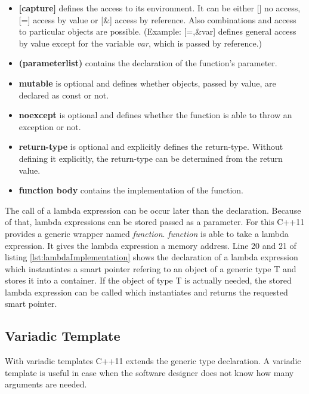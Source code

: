 {\begin{itemize}
  \item\textbf{[capture]} defines the access to its environment. It can be either [] no access, [=] access by value or [\&] access by reference. Also combinations and access to particular objects are possible. (Example: [=,\&var] defines general access by value except for the variable \emph{var}, which is passed by reference.)
  \item\textbf{(parameterlist)} contains the declaration of the function's parameter. 
  \item\textbf{mutable} is optional and defines whether objects, passed by value, are  declared as const or not. 
  \item\textbf{noexcept} is optional and defines whether the function is able to throw an exception or not.
  \item\textbf{return-type} is optional and explicitly defines the return-type. Without defining it explicitly, the return-type can be determined from the return value.
  \item\textbf{function body} contains the implementation of the function.
\end{itemize}

\noindent The call of a lambda expression can be occur later than the declaration. Because of that, lambda expressions can be stored passed as a parameter. For this C++11 provides a generic wrapper named \emph{function}. \emph{function} is able to take a lambda expression. It gives the lambda expression a memory address. Line 20 and 21 of listing \ref{lst:lambdaImplementation} shows the declaration of a lambda expression which instantiates a smart pointer refering to an object of a generic type T and stores it into a container. If the object of type T is actually needed, the stored lambda expression can be called which instantiates and returns the requested smart pointer. 

\subsection{Variadic Template}\label{sec:variadicTemplate}
\noindent With variadic templates C++11 extends the generic type declaration. A variadic template is useful in case when the software designer does not know how many arguments are needed. \cite[cf.][785]{Kirch2015} 

}
